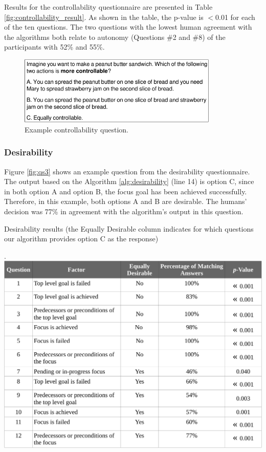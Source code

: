 \documentclass[12pt]{report}
\begin{document}
Results for the controllability questionnaire are presented in Table
\ref{fig:controllability_result}. As shown in the table, the p-value is $<$0.01
for each of the ten questions. The two questions with the lowest human agreement
with the algorithms both relate to autonomy (Questions \#2 and \#8) of the
participants with 52\% and 55\%.

\begin{figure}[tbh]
  \centering
  \includegraphics[width=0.85\textwidth]{figure/question-sample2-croped.pdf}
  \caption{{Example controllability question.}}
  \label{fig:qs2}
\end{figure}

\subsubsection{Desirability}
\label{sec:desirability-crowdsourcing}
Figure \ref{fig:qs3} shows an example question from the desirability
questionnaire. The output based on the Algorithm \ref{alg:desirability}
(line 14) is option C, since in both option A and option B, the focus goal
has been achieved successfully. Therefore, in this example, both options A and B
are desirable. The humans' decision was 77\% in agreement with the algorithm's
output in this question.

\begin{table}[t]
  \centering
  \caption{Desirability results (the Equally Desirable column indicates
  for which questions our algorithm provides option C as the response)}.
  \label{fig:desirability_result}
  \vspace*{-3mm}
  \includegraphics[width=1\textwidth]{figure/desirability_result_croped.pdf}
\end{table}
\end{document}
